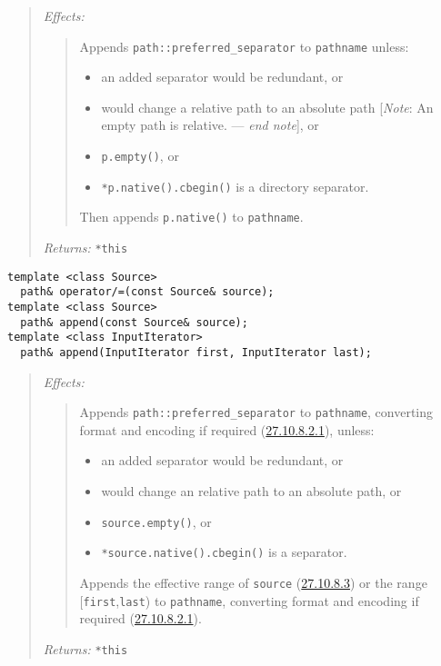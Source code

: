 \begin{quote}
\emph{Effects:}

\begin{quote}
Appends \texttt{path::preferred\_separator} to \texttt{pathname} unless:

\begin{itemize}
\tightlist
\item
  an added separator would be redundant, or
\item
  would change a relative path to an absolute path {[}\emph{Note}: An
  empty path is relative. --- \emph{end note}{]}, or
\item
  \texttt{p.empty()}, or
\item
  \texttt{*p.native().cbegin()} is a directory separator.
\end{itemize}

Then appends \texttt{p.native()} to \texttt{pathname}.
\end{quote}

\emph{Returns:} \texttt{*this}
\end{quote}

\begin{verbatim}
template <class Source>
  path& operator/=(const Source& source);
template <class Source>
  path& append(const Source& source);
template <class InputIterator>
  path& append(InputIterator first, InputIterator last);
\end{verbatim}

\begin{quote}
\emph{Effects:}

\begin{quote}
Appends \texttt{path::preferred\_separator} to \texttt{pathname},
converting format and encoding if required
(\hyperref[path.arg.convert]{27.10.8.2.1}), unless:

\begin{itemize}
\tightlist
\item
  an added separator would be redundant, or
\item
  would change an relative path to an absolute path, or
\item
  \texttt{source.empty()}, or
\item
  \texttt{*source.native().cbegin()} is a separator.
\end{itemize}

Appends the effective range of \texttt{source}
(\hyperref[path.req]{27.10.8.3}) or the range
{[}\texttt{first},\texttt{last}) to \texttt{pathname}, converting format
and encoding if required (\hyperref[path.arg.convert]{27.10.8.2.1}).
\end{quote}

\emph{Returns:} \texttt{*this}
\end{quote}

